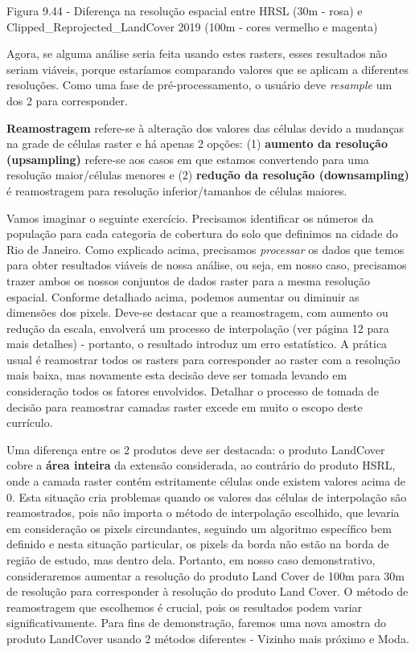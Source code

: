\documentclass[
  portuguese,
]{krantz}
\begin{document}
Figura 9.44 - Diferença na resolução espacial entre HRSL (30m - rosa) e Clipped\_Reprojected\_LandCover 2019 (100m - cores vermelho e magenta)

Agora, se alguma análise seria feita usando estes rasters, esses resultados não seriam viáveis, porque estaríamos comparando valores que se aplicam a diferentes resoluções. Como uma fase de pré-processamento, o usuário deve \emph{resample} um dos 2 para corresponder.

\textbf{Reamostragem} refere-se à alteração dos valores das células devido a mudanças na grade de células raster e há apenas 2 opções: (1) \textbf{aumento da resolução (upsampling)} refere-se aos casos em que estamos convertendo para uma resolução maior/células menores e (2) \textbf{redução da resolução (downsampling)} é reamostragem para resolução inferior/tamanhos de células maiores.

Vamos imaginar o seguinte exercício. Precisamos identificar os números da população para cada categoria de cobertura do solo que definimos na cidade do Rio de Janeiro. Como explicado acima, precisamos \emph{processar} os dados que temos para obter resultados viáveis \hspace{0pt}\hspace{0pt}de nossa análise, ou seja, em nosso caso, precisamos trazer ambos os nossos conjuntos de dados raster para a mesma resolução espacial. Conforme detalhado acima, podemos aumentar ou diminuir as dimensões dos pixels. Deve-se destacar que a reamostragem, com aumento ou redução da escala, envolverá um processo de interpolação (ver página 12 para mais detalhes) - portanto, o resultado introduz um erro estatístico. A prática usual é reamostrar todos os rasters para corresponder ao raster com a resolução mais baixa, mas novamente esta decisão deve ser tomada levando em consideração todos os fatores envolvidos. Detalhar o processo de tomada de decisão para reamostrar camadas raster excede em muito o escopo deste currículo.

Uma diferença entre os 2 produtos deve ser destacada: o produto LandCover cobre a \textbf{área inteira} da extensão considerada, ao contrário do produto HSRL, onde a camada raster contém estritamente células onde existem valores acima de 0. Esta situação cria problemas quando os valores das células de interpolação são reamostrados, pois não importa o método de interpolação escolhido, que levaria em consideração os pixels circundantes, seguindo um algoritmo específico bem definido e nesta situação particular, os pixels da borda não estão na borda de região de estudo, mas dentro dela. Portanto, em nosso caso demonstrativo, consideraremos aumentar a resolução do produto Land Cover de 100m para 30m de resolução para corresponder à resolução do produto Land Cover. O método de reamostragem que escolhemos é crucial, pois os resultados podem variar significativamente. Para fins de demonstração, faremos uma nova amostra do produto LandCover usando 2 métodos diferentes - Vizinho mais próximo e Moda.
\end{document}
